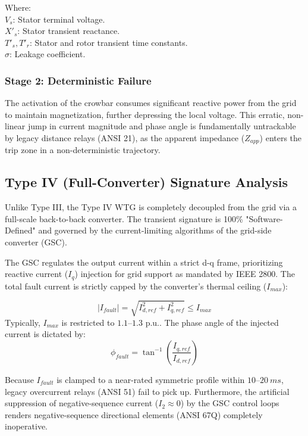 Where:\\
$V_s$: Stator terminal voltage.\\
$X'_s$: Stator transient reactance.\\
$T'_s, T'_r$: Stator and rotor transient time constants.\\
$\sigma$: Leakage coefficient.

\subsubsection{Stage 2: Deterministic Failure}
The activation of the crowbar consumes significant reactive power from the grid to maintain magnetization, further depressing the local voltage. This erratic, non-linear jump in current magnitude and phase angle is fundamentally untrackable by legacy distance relays (ANSI 21), as the apparent impedance ($Z_{app}$) enters the trip zone in a non-deterministic trajectory.

\subsection{Type IV (Full-Converter) Signature Analysis}
Unlike Type III, the Type IV WTG is completely decoupled from the grid via a full-scale back-to-back converter. The transient signature is 100\% "Software-Defined" and governed by the current-limiting algorithms of the grid-side converter (GSC).

The GSC regulates the output current within a strict d-q frame, prioritizing reactive current ($I_q$) injection for grid support as mandated by IEEE 2800. The total fault current is strictly capped by the converter's thermal ceiling ($I_{max}$):

\begin{equation}
|I_{fault}| = \sqrt{I_{d,ref}^2 + I_{q,ref}^2} \leq I_{max} 
\end{equation}
Typically, $I_{max}$ is restricted to $1.1\text{--}1.3 \text{ p.u.}$. The phase angle of the injected current is dictated by:
\begin{equation}
\phi_{fault} = \tan^{-1}\left(\frac{I_{q,ref}}{I_{d,ref}}\right) 
\end{equation}

Because $I_{fault}$ is clamped to a near-rated symmetric profile within $10\text{--}20 \ ms$, legacy overcurrent relays (ANSI 51) fail to pick up. Furthermore, the artificial suppression of negative-sequence current ($I_2 \approx 0$) by the GSC control loops renders negative-sequence directional elements (ANSI 67Q) completely inoperative.





